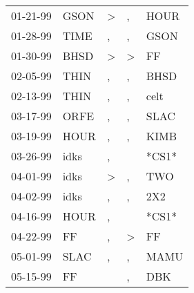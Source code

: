 \begin{supertabular}{p{0.07\textwidth}p{0.06\textwidth}p{0.02\textwidth}p{0.02\textwidth}p{0.06\textwidth}}
          01-21-99\textsuperscript{} &           GSON\textsuperscript{} &     \textgreater &             , &           HOUR\textsuperscript{} \\
          01-28-99\textsuperscript{} &           TIME\textsuperscript{} &                , &             , &           GSON\textsuperscript{} \\
          01-30-99\textsuperscript{} &           BHSD\textsuperscript{} &     \textgreater &  \textgreater &             FF\textsuperscript{} \\
          02-05-99\textsuperscript{} &           THIN\textsuperscript{} &                , &             , &           BHSD\textsuperscript{} \\
          02-13-99\textsuperscript{} &           THIN\textsuperscript{} &                , &             , &           celt\textsuperscript{} \\
          03-17-99\textsuperscript{} &           ORFE\textsuperscript{} &                , &             , &           SLAC\textsuperscript{} \\
          03-19-99\textsuperscript{} &           HOUR\textsuperscript{} &                , &             , &           KIMB\textsuperscript{} \\
          03-26-99\textsuperscript{} &           idks\textsuperscript{} &                , &               &                            *CS1* \\
          04-01-99\textsuperscript{} &           idks\textsuperscript{} &     \textgreater &             , &            TWO\textsuperscript{} \\
          04-02-99\textsuperscript{} &           idks\textsuperscript{} &                , &             , &            2X2\textsuperscript{} \\
          04-16-99\textsuperscript{} &           HOUR\textsuperscript{} &                , &               &                            *CS1* \\
          04-22-99\textsuperscript{} &             FF\textsuperscript{} &                , &  \textgreater &             FF\textsuperscript{} \\
          05-01-99\textsuperscript{} &           SLAC\textsuperscript{} &                , &             , &           MAMU\textsuperscript{} \\
          05-15-99\textsuperscript{} &             FF\textsuperscript{} &                  &             , &            DBK\textsuperscript{} \\

\end{supertabular}
